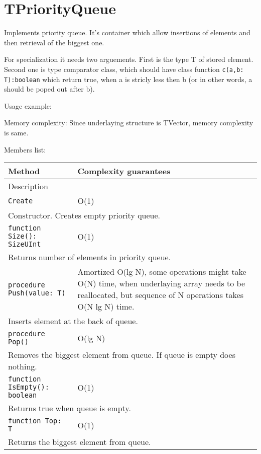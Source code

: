 \chapter{TPriorityQueue}

Implements priority queue. It's container which allow insertions of elements and then retrieval of
the biggest one.

For specialization it needs two arguements. First is the type T of stored element. Second one is type
comparator class, which should have class function \verb!c(a,b: T):boolean! which return true, when
a is stricly less then b (or in other words, a should be poped out after b).

Usage example:



Memory complexity:
Since underlaying structure is TVector, memory complexity is same.

Members list:

\begin{longtable}{|m{10cm}|m{5cm}|}
\hline
Method & Complexity guarantees \\ \hline
\multicolumn{2}{|m{15cm}|}{Description} \\ \hline\hline

\verb!Create! & O(1) \\ \hline
\multicolumn{2}{|m{15cm}|}{Constructor. Creates empty priority queue.} \\ \hline\hline

\verb!function Size(): SizeUInt! & O(1) \\ \hline
\multicolumn{2}{|m{15cm}|}{Returns number of elements in priority queue.} \\\hline\hline

\verb!procedure Push(value: T)! &  Amortized
O(lg N), some operations might take O(N) time, when underlaying array needs to be reallocated, but sequence of N
operations takes O(N lg N) time. \\ \hline
\multicolumn{2}{|m{15cm}|}{Inserts element at the back of queue.} \\\hline\hline

\verb!procedure Pop()! & O(lg N) \\\hline
\multicolumn{2}{|m{15cm}|}{Removes the biggest element from queue. If queue is empty does nothing.} \\\hline\hline

\verb!function IsEmpty(): boolean! & O(1) \\ \hline
\multicolumn{2}{|m{15cm}|}{Returns true when queue is empty.} \\\hline\hline

\verb!function Top: T! & O(1) \\\hline
\multicolumn{2}{|m{15cm}|}{Returns the biggest element from queue.} \\\hline

\end{longtable}
